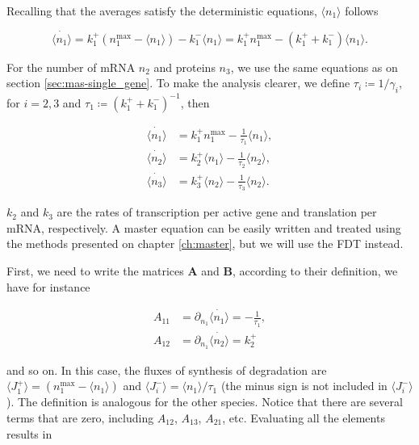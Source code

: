 Recalling that the averages satisfy the deterministic equations, $\langle n_1\rangle$ follows

\begin{equation*}
  \dot{\langle n_1\rangle} = k_1^+(n_1^\text{max}-\langle n_1\rangle) - k_1^-\langle n_1\rangle = k_1^+n_1^\text{max} - (k_1^++k_1^-)\langle n_1\rangle.
\end{equation*}

For the number of mRNA $n_2$ and proteins $n_3$, we use the same equations as on section \ref{sec:mas-single_gene}. To make the analysis clearer, we define $\tau_i\coloneqq 1/\gamma_i$, for $i=2,3$ and $\tau_1\coloneqq (k_1^++k_1^-)^{-1}$, then

\begin{equation}
  \begin{split}
    \dot{\langle n_1\rangle} &= k_1^+n_1^\text{max} - \frac{1}{\tau_1}\langle n_1\rangle,\\
    \dot{\langle n_2\rangle} &= k_2^+\langle n_1\rangle - \frac{1}{\tau_2}\langle n_2\rangle,\\
    \dot{\langle n_3\rangle} &= k_3^+\langle n_2\rangle - \frac{1}{\tau_3}\langle n_2\rangle.
  \end{split}
\end{equation}

$k_2$ and $k_3$ are the rates of transcription per active gene and translation per mRNA, respectively. A master equation can be easily written and treated using the methods presented on chapter \ref{ch:master}, but we will use the FDT instead.

First, we need to write the matrices $\mathbf{A}$ and $\mathbf{B}$, according to their definition, we have for instance

\begin{equation*}
  \begin{split}
    A_{11} &= \partial_{n_1}\dot{\langle n_1\rangle} =-\frac{1}{\tau_1},\\
    A_{12} &= \partial_{n_1}\dot{\langle n_2\rangle} = k_2^+
  \end{split}
\end{equation*}

and so on. In this case, the fluxes of synthesis of degradation are $\langle J_1^+\rangle = (n_1^\text{max}-\langle n_1\rangle)$ and $\langle J_i^-\rangle = \langle n_1\rangle/\tau_1$ (the minus sign is not included in $\langle J_i^-\rangle$). The definition is analogous for the other species. Notice that there are several terms that are zero, including $A_{12}$, $A_{13}$, $A_{21}$, etc. Evaluating all the elements results in

